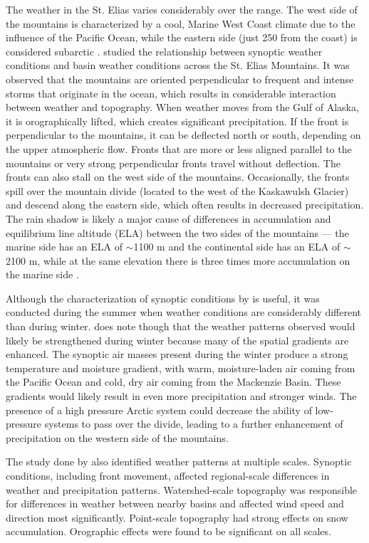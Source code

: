 \documentclass{sfuthesis}
\begin{document}
\begin{appendices}
The weather in the St. Elias varies considerably over the range. The west side of the mountains is characterized by a cool, Marine West Coast climate due to the influence of the Pacific Ocean, while the eastern side (just 250 from the coast) is considered subarctic \citep{Marcus1970}. \cite{Taylor1969} studied the relationship between synoptic weather conditions and basin weather conditions across the St. Elias Mountains. It was observed that the mountains are oriented perpendicular to frequent and intense storms that originate in the ocean, which results in considerable interaction between weather and topography. When weather moves from the Gulf of Alaska, it is orographically lifted, which creates significant precipitation. If the front is perpendicular to the mountains, it can be deflected north or south, depending on the upper atmospheric flow. Fronts that are more or less aligned parallel to the mountains or very strong perpendicular fronts travel without deflection. The fronts can also stall on the west side of the mountains. Occasionally, the fronts spill over the mountain divide (located to the west of the Kaskawulsh Glacier) and descend along the eastern side, which often results in decreased precipitation. The rain shadow is likely a major cause of differences in accumulation and equilibrium line altitude (ELA) between the two sides of the mountains --- the marine side has an ELA of $\sim$1100 m and the continental side has an ELA of $\sim$2100 m, while at the same elevation there is three times more accumulation on the marine side \citep{Marcus1970}.

Although the characterization of synoptic conditions by \cite{Taylor1969} is useful, it was conducted during the summer when weather conditions are considerably different than during winter. \cite{Taylor1969} does note though that the weather patterns observed would likely be strengthened during winter because many of the spatial gradients are enhanced. The synoptic air masses present during the winter produce a strong temperature and moisture gradient, with warm, moisture-laden air coming from the Pacific Ocean and cold, dry air coming from the Mackenzie Basin. These gradients would likely result in even more precipitation and stronger winds. The presence of a high pressure Arctic system could decrease the ability of low-pressure systems to pass over the divide, leading to a further enhancement of precipitation on the western side of the mountains. 

The study done by \cite{Taylor1969} also identified weather patterns at multiple scales. Synoptic conditions, including front movement, affected regional-scale differences in weather and precipitation patterns. Watershed-scale topography was responsible for differences in weather between nearby basins and affected wind speed and direction most significantly. Point-scale topography had strong effects on snow accumulation. Orographic effects were found to be significant on all scales. 


\end{appendices}
\end{document}

